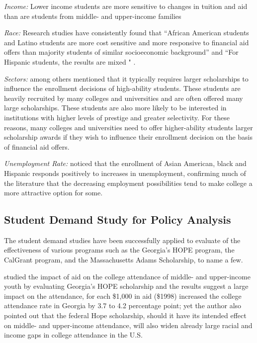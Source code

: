 \documentclass[12pt,english]{report}
\begin{document}
\vspace{0.15in}
\noindent \textit{Income: } Lower income students are more sensitive to changes in tuition and aid than are students from middle- and upper-income families \citep{Crouse2015}

\vspace{0.15in}
\noindent \textit{Race: }  Research studies have consistently found that ``African American students and Latino students are more cost sensitive and more responsive to financial aid offers than majority students of similar
socioeconomic background''  and ``For Hispanic students, the results are mixed " \citet{Hossler1989}.

\vspace{0.15in}
\noindent \textit{Sectors: }  \citet{Heller1999} among others mentioned that it typically requires larger scholarships to influence the enrollment decisions of high-ability students.  These students are heavily recruited by many colleges and universities and are often offered many large scholarships. These students are also more likely to be interested in institutions with higher levels of prestige and greater selectivity.  For these reasons, many colleges and universities need to offer higher-ability students larger scholarship awards if they wish to influence their enrollment decision on the basis of financial aid offers.

\vspace{0.25in}
\noindent \textit{Unemployment Rate:}  \citet{Heller1999} noticed that the enrollment of Asian American, black and Hispanic responds positively to increases in unemployment, confirming much of the literature that the decreasing employment possibilities tend to make college a more attractive option for some.

\subsection{Student Demand Study for Policy Analysis }
The student demand studies have been successfully applied to evaluate of the effectiveness of various programs such as the Georgia's HOPE program, the CalGrant program,  and the Massachusetts Adams Scholarship, to name a few.

\citet{Dynarski2000} studied the impact of aid on the college attendance of middle- and upper-income youth by evaluating Georgia's HOPE scholarship and the results suggest a large impact on the attendance, for each \$1,000 in aid (\$1998) increased the college attendance rate in Georgia by 3.7  to 4.2 percentage point; yet the author also pointed out that the federal Hope scholarship, should it have its intended effect on middle- and upper-income attendance, will also widen already large racial and income gaps in college attendance in the U.S.
\end{document}
